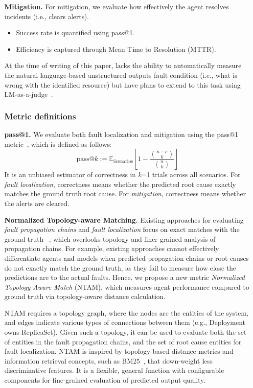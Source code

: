 \textbf{Mitigation.}
For mitigation, we evaluate how effectively the agent resolves incidents (i.e., clears alerts).
\begin{itemize}[left=0pt, topsep=0pt, partopsep=0pt, itemsep=0pt, parsep=0pt]
    \item Success rate is quantified using pass@1.
    \item Efficiency is captured through Mean Time to Resolution (MTTR).
\end{itemize}
At the time of writing of this paper, \bench lacks the ability to automatically measure the natural language-based unstructured outputs fault condition (i.e., what is wrong with the identified resource) but have plans to extend to this task using LM-as-a-judge~\cite{zheng2023judgingllmasajudgemtbenchchatbot}.

\subsubsection{Metric definitions}
\label{appx:ntam}
\textbf{pass@1.}
We evaluate both fault localization and mitigation using the pass@1 metric~\cite{chen2021evaluating}, which is defined as follows:
$$\text{pass@}k := \mathbb{E}_{\text{Scenarios}}\left[1 - \frac{\binom{n-c}{k}}{\binom{n}{k}}\right] $$
It is an unbiased estimator of correctness in \textit{k}=1 trials across all scenarios. For \textit{fault localization}, correctness means whether the predicted root cause exactly matches the ground truth root cause. For \textit{mitigation}, correctness means whether the alerts are cleared. 


\textbf{Normalized Topology-aware Matching.}
Existing approaches for evaluating \textit{fault propagation chains} and \textit{fault localization} focus on exact matches with  the ground truth ~\cite{ahmed2023recommending, zhu2024hemirca, chen2024automatic}, which overlooks topology and finer-grained analysis of propagation chains. For example, existing approaches cannot effectively differentiate agents and models when predicted propagation chains or root causes do not exactly match the ground truth, as they fail to measure how close the predictions are to the actual faults. %
Hence, we propose a new metric \textit{Normalized Topology-Aware Match} (NTAM), which measures agent performance compared to ground truth via topology-aware distance calculation.

NTAM requires a topology graph, where the nodes are the entities of the system, and edges indicate various types of connections between them (e.g., Deployment owns ReplicaSet). Given such a topology, it can be used to evaluate both the set of entities in the fault propagation chains, and the set of root cause entities for fault localization. NTAM is inspired by topology-based distance metrics and information retrieval concepts, such as BM25~\cite{fang2011diagnostic}, that down-weight less discriminative features. It is a flexible, general function with configurable components for fine-grained evaluation of predicted output quality.%

